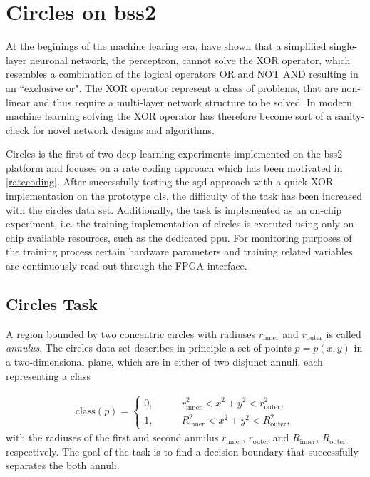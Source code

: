 \chapter{Circles on \acrshort{bss2}}
At the beginings of the machine learing era, \cite{perceptron} have shown that a simplified single-layer neuronal network, the perceptron, cannot solve the XOR operator, which resembles a combination of the logical operators OR and NOT AND resulting in an ``exclusive or". The XOR operator represent a class of problems, that are non-linear and thus require a multi-layer network structure to be solved. In modern machine learning solving the XOR operator has therefore become sort of a sanity-check for novel network designs and algorithms.

Circles is the first of two deep learning experiments implemented on the \gls{bss2} platform and focuses on a rate coding approach which has been motivated in \cref{ratecoding}. After successfully testing the \acrlong{sgd} approach with a quick XOR implementation on the prototype \gls{dls}, the difficulty of the task has been increased with the circles data set. Additionally, the task is implemented as an on-chip experiment, i.e. the training implementation of circles is executed using only on-chip available resources, such as the dedicated \acrlong{ppu}. For monitoring purposes of the training process certain hardware parameters and training related variables are continuously read-out through the FPGA interface.





\section{Circles Task}
\label{circlestask}
A region bounded by two concentric circles with radiuses $r_{\text{inner}}$ and $r_{\text{outer}}$ is called \emph{annulus}. The circles data set describes in principle a set of points $p = p(x,y)$ in a two-dimensional plane, which are in either of two disjunct annuli, each representing a class 

\begin{align}
\text{class}(p) =
\begin{cases}
0 ,&\quad \quad r_{\text{inner}}^2 < x^2 + y^2 < r_{\text{outer}}^2, \\
1 ,&\quad \quad R_{\text{inner}}^2 < x^2 + y^2 < R_{\text{outer}}^2,
\end{cases}
\end{align}
with the radiuses of the first and second annulus $r_{\text{inner}}$, $r_{\text{outer}}$ and  $R_{\text{inner}}$, $R_{\text{outer}}$ respectively. The goal of the task is to find a decision boundary that successfully separates the both annuli.

